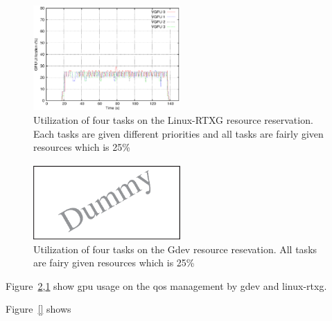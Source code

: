 \begin{figure}[t]
\begin{center}
\includegraphics[width=0.5\textwidth]{img/rtx_qos.eps}
\caption{Utilization of four tasks on the Linux-RTXG resource reservation. Each tasks are given different priorities and all tasks are fairly given resources which is 25\%}
\end{center}
\label{fig:qos_rtx}
\end{figure}

\begin{figure}[t]
\begin{center}
\includegraphics[width=0.5\textwidth]{img/dummy}
\caption{Utilization of four tasks on the Gdev resource resevation. All tasks are fairy given resources which is 25\%}
\end{center}
\label{fig:qos_gdev}
\end{figure}

Figure~\ref{fig:qos_gdev},\ref{fig:qos_rtx} show gpu usage on the qos management by gdev and linux-rtxg.



Figure~\ref{} shows 
